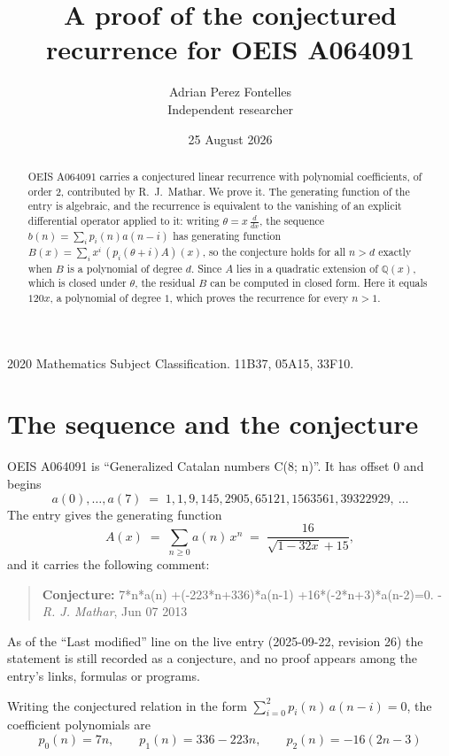 \documentclass[11pt,a4paper]{article}
\title{A proof of the conjectured recurrence for OEIS A064091}
\author{Adrian Perez Fontelles\\ \small Independent researcher}
\date{25 August 2026}
\theoremstyle{plain}
\theoremstyle{definition}
\begin{document}
\maketitle

\begin{abstract}
OEIS A064091 carries a conjectured linear recurrence with polynomial coefficients, of
order 2, contributed by R.~J.~Mathar. We prove it. The generating function of the
entry is algebraic, and the recurrence is equivalent to the vanishing of an explicit
differential operator applied to it: writing $\theta=x\,\frac{d}{dx}$, the sequence
$b(n)=\sum_{i}p_{i}(n)a(n-i)$ has generating function
$B(x)=\sum_{i}x^{i}\,(p_{i}(\theta+i)A)(x)$, so the conjecture holds for all $n>d$ exactly
when $B$ is a polynomial of degree $d$. Since $A$ lies in a quadratic extension of
$\mathbb{Q}(x)$, which is closed under $\theta$, the residual $B$ can be computed in
closed form. Here it equals $120 x$, a polynomial of degree $1$, which proves
the recurrence for every $n>1$.
\end{abstract}

\noindent\small 2020 Mathematics Subject Classification. 11B37, 05A15, 33F10.\normalsize

\section{The sequence and the conjecture}

OEIS A064091 is ``Generalized Catalan numbers C(8; n)''. It has offset $0$ and begins
\[
a(0),\dots,a(7)\;=\;1, 1, 9, 145, 2905, 65121, 1563561, 39322929,\ \dots
\]
The entry gives the generating function
\begin{equation}\label{eq:gf}
A(x)\;=\;\sum_{n\ge 0} a(n)\,x^{n}\;=\;\frac{16}{\sqrt{1 - 32 x} + 15} ,
\end{equation}
and it carries the following comment:
\begin{quote}\small
\textbf{Conjecture:} 7*n*a(n) +(-223*n+336)*a(n-1) +16*(-2*n+3)*a(n-2)=0. - \emph{R. J. Mathar}, Jun 07 2013
\end{quote}
As of the ``Last modified'' line on the live entry (2025-09-22, revision 26) the
statement is still recorded as a conjecture, and no proof appears among the entry's links,
formulas or programs.

Writing the conjectured relation in the form $\sum_{i=0}^{2}p_{i}(n)\,a(n-i)=0$,
the coefficient polynomials are
\[
p_{0}(n)=7 n,\qquad p_{1}(n)=336 - 223 n,\qquad p_{2}(n)=- 16 \left(2 n - 3\right)
\]
\end{document}
